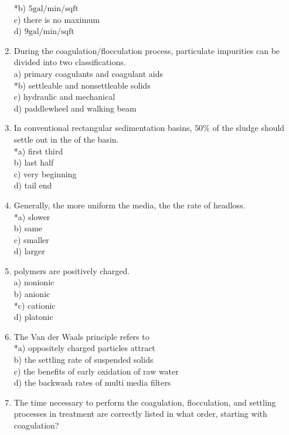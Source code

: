 \begin{enumerate}
*b) $5 \mathrm{gal} / \mathrm{min} / \mathrm{sq} \mathrm{ft}$\\
c) there is no maximum\\
d) $9 \mathrm{gal} / \mathrm{min} / \mathrm{sq} \mathrm{ft}$\\
\item During the coagulation/flocculation process, particulate impurities can be divided into two classifications.\\
a) primary coagulants and coagulant aids\\
*b) settleable and nonsettleable solids\\
c) hydraulic and mechanical\\
d) paddlewheel and walking beam\\
\item In conventional rectangular sedimentation basins, $50 \%$ of the sludge should settle out in the of the basin.\\
*a) first third\\
b) last half\\
c) very beginning\\
d) tail end\\
\item Generally, the more uniform the media, the the rate of headloss.\\
*a) slower\\
b) same\\
c) smaller\\
d) larger\\
\item polymers are positively charged.\\
a) nonionic\\
b) anionic\\
*c) cationic\\
d) platonic\\
\item The Van der Waals principle refers to\\
*a) oppositely charged particles attract\\
b) the settling rate of suspended solids\\
c) the benefits of early oxidation of raw water\\
d) the backwash rates of multi media filters\\
\item The time necessary to perform the coagulation, flocculation, and settling processes in treatment are correctly listed in what order, starting with coagulation?\\

\end{enumerate}
